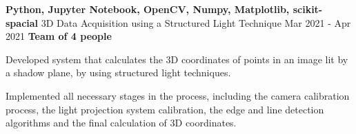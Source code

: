\cventry
  {\textbf{Python, Jupyter Notebook, OpenCV, Numpy, Matplotlib, scikit-spacial}}
  {3D Data Acquisition using a Structured Light Technique \href{https://github.com/EduRibeiro00/ArtworkRecognition-feup-vcom/tree/master/proj1}{\faExternalLink}} %
  {Mar 2021 - Apr 2021}
  {\textbf{Team of 4 people}}
  {
    \begin{cvitems} %
      \item {Developed system that calculates the 3D coordinates of points in an image lit by a shadow plane, by using structured light techniques.}
      \item {Implemented all necessary stages in the process, including the camera calibration process, the light projection system calibration, the edge and line detection algorithms and the final calculation of 3D coordinates.}
    \end{cvitems}
  }